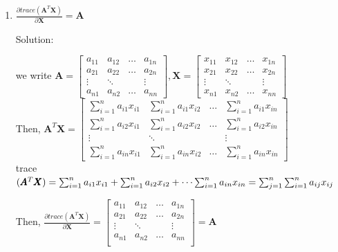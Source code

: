 \documentclass[12pt]{article}
\newcommand{\solu}{{\color{blue} Solution:}}
\begin{document}
\begin{enumerate}
\begin{enumerate}
            \item $\frac{\partial trace(\pmb{A}^T\pmb{X})}{\partial \pmb{X}} = \pmb{A}$ 
            
            \solu 

            we write $\pmb{A} = \begin{bmatrix}
                a_{11} & a_{12} & \dots & a_{1n} \\
                a_{21} & a_{22} & \dots & a_{2n} \\
                \vdots & \ddots &  & \vdots \\
                a_{n1} & a_{n2} & \dots & a_{nn}
            \end{bmatrix}, \pmb{X} = 
            \begin{bmatrix}
                x_{11} & x_{12} & \dots & x_{1n} \\
                x_{21} & x_{22} & \dots & x_{2n} \\
                \vdots & \ddots &  & \vdots \\
                x_{n1} & x_{n2} & \dots & x_{nn}
            \end{bmatrix}$\\
            Then, $\pmb{A}^T\pmb{X} = 
            \begin{bmatrix}
                \sum_{i = 1}^n a_{i1}x_{i1} & \sum_{i = 1}^n a_{i1}x_{i2} & \dots & \sum_{i = 1}^n a_{i1}x_{in}\\
                \sum_{i = 1}^n a_{i2}x_{i1} & \sum_{i = 1}^n a_{i2}x_{i2} & \dots & \sum_{i = 1}^n a_{i2}x_{in} \\
                \vdots & \ddots &  & \vdots \\
                \sum_{i = 1}^n a_{in}x_{i1} & \sum_{i = 1}^n a_{in}x_{i2}& \dots  &  \sum_{i = 1}^n a_{in}x_{in}
            \end{bmatrix}$\\
            trace$(\pmb{A}^T\pmb{X}) = \sum_{i = 1}^n a_{i1}x_{i1} + \sum_{i = 1}^n a_{i2}x_{i2}  + \dots \sum_{i = 1}^n a_{in}x_{in} \\
            = \sum_{j = 1}^{n}\sum_{i = 1}^{n} a_{ij}x_{ij}$

            Then, $\frac{\partial trace(\pmb{A}^T\pmb{X})}{\partial \pmb{X}} =
            \begin{bmatrix}
                a_{11} & a_{12} & \dots & a_{1n} \\
                a_{21} & a_{22} & \dots & a_{2n} \\
                \vdots & \ddots &  & \vdots \\
                a_{n1} & a_{n2} & \dots & a_{nn} \\
            \end{bmatrix} = \pmb{A}
            $ 


\end{enumerate}
\end{enumerate}
\end{document}
